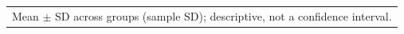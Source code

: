 \begin{tabular}{lrrrrrrrrrrrrrrrrrrrrrrrrrrrrrrrrrrrrrrrrrrrrrrrrrrrrrrr}
\bottomrule
\multicolumn{56}{l}{\scriptsize Mean $\pm$ SD across groups (sample SD); descriptive, not a confidence interval.} \\
\end{tabular}
